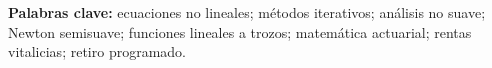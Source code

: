 \vspace{.5cm}
\noindent\textbf{Palabras clave:} ecuaciones no lineales; métodos iterativos;
análisis no suave; Newton semisuave; funciones lineales a trozos; matemática
actuarial; rentas vitalicias; retiro programado.

\vspace{.4cm}
